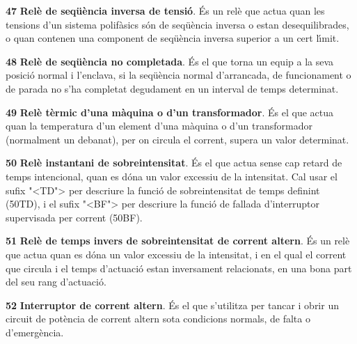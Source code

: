 \begin{multicols}{2}
\begin{list}{}
\item[\textbf{47}]   
\textbf{Rel\`{e}
de seq\"{u}\`{e}ncia inversa de tensi\'{o}}. \'{E}s un rel\`{e} que actua quan les
tensions d'un sistema polif\`{a}sics s\'{o}n de seq\"{u}\`{e}ncia inversa o estan
desequilibrades, o quan contenen una component de seq\"{u}\`{e}ncia inversa
superior a un cert l\'{\i}mit.

\item[\textbf{48}]   
\textbf{Rel\`{e} de seq\"{u}\`{e}ncia
no completada}. \'{E}s el que torna un equip a la seva posici\'{o} normal  i
l'enclava, si la seq\"{u}\`{e}ncia normal d'arrancada, de funcionament o de
parada no s'ha completat degudament en un interval de temps
determinat.

\item[\textbf{49}]  
\textbf{Rel\`{e} t\`{e}rmic d'una m\`{a}quina o d'un transformador}. \'{E}s el que
actua quan la temperatura d'un element d'una m\`{a}quina o d'un
transformador (normalment un debanat), per on circula el corrent,
supera un valor determinat.

\item[\textbf{50}]   
\textbf{Rel\`{e} instantani de sobreintensitat}. \'{E}s el que actua sense cap retard de temps intencional, quan es d\'{o}na un valor excessiu de la
intensitat. Cal usar el sufix {"<}TD{">} per descriure la funci\'{o} de sobreintensitat de temps definint (50TD), i el sufix {"<}BF{">} per descriure la funci\'{o} de fallada d'interruptor supervisada per corrent (50BF).

\item[\textbf{51}]  
\textbf{Rel\`{e} de temps invers  de sobreintensitat de corrent altern}. \'{E}s
un rel\`{e} que actua quan es d\'{o}na un valor excessiu de la intensitat, i en el qual el corrent que circula i el temps d'actuaci\'{o} estan inversament relacionats, en una bona part del seu rang d'actuaci\'{o}.

\item[\textbf{52}]   
\textbf{Interruptor de corrent altern}. \'{E}s
 el que s'utilitza per tancar i obrir un circuit de pot\`{e}ncia de corrent altern sota condicions
normals, de falta o d'emerg\`{e}ncia.


\end{list}
\end{multicols}
